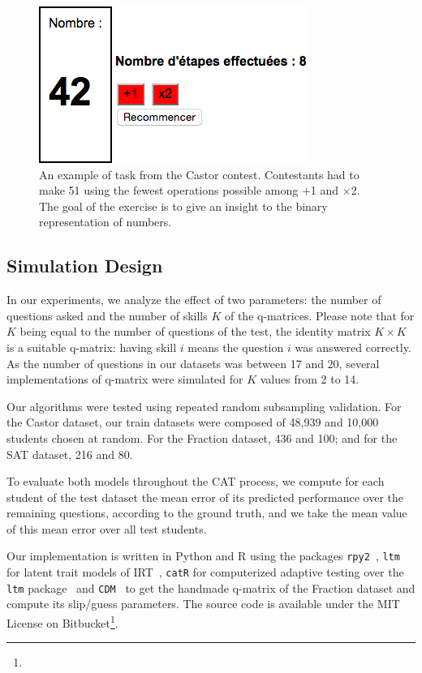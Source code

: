 \documentclass{edm_template}
\begin{document}
\begin{figure}
\includegraphics[width=\linewidth]{51-calc}
\caption{An example of task from the Castor contest. Contestants had to make 51 using the fewest operations possible among $+$1 and $\times$2. The goal of the exercise is to give an insight to the binary representation of numbers.}
\label{fig:51}
\end{figure}

\subsection{Simulation Design}

In our experiments, we analyze the effect of two parameters: the number of questions asked and the number of skills $K$ of the q-matrices. Please note that for $K$ being equal to the number of questions of the test, the identity matrix $K \times K$ is a suitable q-matrix: having skill $i$ means the question $i$ was answered correctly. As the number of questions in our datasets was between 17 and 20, several implementations of q-matrix were simulated for $K$ values from 2 to 14.

Our algorithms were tested using repeated random subsampling validation. For the Castor dataset, our train datasets were composed of 48,939 and 10,000 students chosen at random. For the Fraction dataset, 436 and 100; and for the SAT dataset, 216 and 80. 

To evaluate both models throughout the CAT process, we compute for each student of the test dataset the mean error of its predicted performance over the remaining questions, according to the ground truth, and we take the mean value of this mean error over all test students.

Our implementation is written in Python and R using the packages \texttt{rpy2}~\cite{Gautier2008}, \texttt{ltm} for latent trait models of IRT~\cite{Rizopoulos2006}, \texttt{catR} for computerized adaptive testing over the \texttt{ltm} package~\cite{MagisRaiche2012} and \texttt{CDM}~\cite{Robitzsch2014} to get the handmade q-matrix of the Fraction dataset and compute its slip/guess parameters. The source code is available under the MIT License on Bitbucket\footnote{}. %
\end{document}
